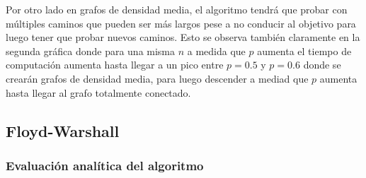Por otro lado en grafos de densidad media, el algoritmo tendrá que probar con múltiples caminos que pueden ser más largos pese a no conducir al objetivo para luego tener que probar nuevos caminos.
Esto se observa también claramente en la segunda gráfica donde para una misma $n$ a medida que $p$ aumenta el tiempo de computación aumenta hasta llegar a un pico entre $p=0.5$ y $p=0.6$ donde se crearán grafos de densidad media, para luego descender a mediad que $p$ aumenta hasta llegar al grafo totalmente conectado.



\subsection{Floyd-Warshall}\label{subsec:fw}

\subsubsection*{Evaluación analítica del algoritmo}

